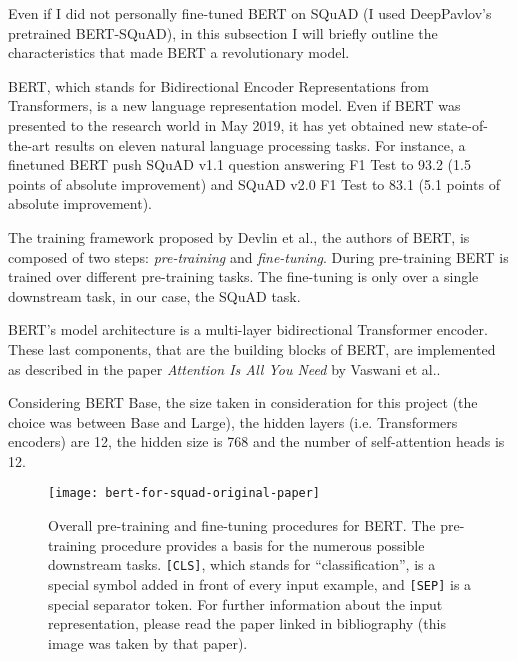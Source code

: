 Even if I did not personally fine-tuned BERT on SQuAD (I used DeepPavlov's pretrained BERT-SQuAD), in this subsection I will briefly outline the characteristics that made BERT a revolutionary model.

BERT, which stands for Bidirectional Encoder Representations from Transformers, is a new language representation model. Even if BERT was presented to the research world in May 2019, it has yet obtained new state-of-the-art results on eleven natural language processing tasks. For instance, a finetuned BERT push SQuAD v1.1 question answering F1 Test to 93.2 (1.5 points of absolute improvement) and SQuAD v2.0 F1 Test to 83.1 (5.1 points of absolute improvement).

The training framework proposed by Devlin et al., the authors of BERT, is composed of two steps: \textit{pre-training} and \textit{fine-tuning}. During pre-training BERT is trained over different pre-training tasks. The fine-tuning is only over a single downstream task, in our case, the SQuAD task.

BERT’s  model  architecture is a multi-layer bidirectional Transformer encoder. These last components, that are the building blocks of BERT, are implemented as described in the paper \textit{Attention Is All You Need} by Vaswani et al..

Considering BERT Base, the size taken in consideration for this project (the choice was between Base and Large), the hidden layers (i.e. Transformers encoders) are 12, the hidden size is 768 and the number of self-attention heads is 12.

\begin{figure}[t]
\centering
\texttt{[image: bert-for-squad-original-paper]}
\caption{Overall pre-training and fine-tuning procedures for BERT. The pre-training procedure provides a basis for the numerous possible downstream tasks. \texttt{[CLS]}, which stands for ``classification'', is a special symbol added in front of every input example, and \texttt{[SEP]} is a special separator token. For further information about the input representation, please read the paper linked in bibliography (this image was taken by that paper).}
\medskip
\label{fig:bertsquad}
\end{figure}

